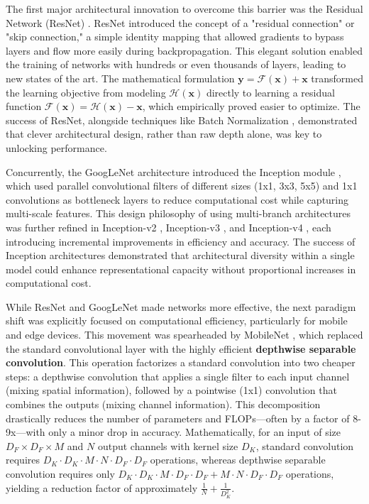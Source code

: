 \documentclass[12pt, a4paper]{article}
\begin{document}
The first major architectural innovation to overcome this barrier was the Residual Network (ResNet) \cite{he2016deep}. ResNet introduced the concept of a "residual connection" or "skip connection," a simple identity mapping that allowed gradients to bypass layers and flow more easily during backpropagation. This elegant solution enabled the training of networks with hundreds or even thousands of layers, leading to new states of the art. The mathematical formulation $\mathbf{y} = \mathcal{F}(\mathbf{x}) + \mathbf{x}$ transformed the learning objective from modeling $\mathcal{H}(\mathbf{x})$ directly to learning a residual function $\mathcal{F}(\mathbf{x}) = \mathcal{H}(\mathbf{x}) - \mathbf{x}$, which empirically proved easier to optimize. The success of ResNet, alongside techniques like Batch Normalization \cite{ioffe2015batch}, demonstrated that clever architectural design, rather than raw depth alone, was key to unlocking performance.

Concurrently, the GoogLeNet architecture introduced the Inception module \cite{szegedy2015going}, which used parallel convolutional filters of different sizes (1x1, 3x3, 5x5) and 1x1 convolutions as bottleneck layers to reduce computational cost while capturing multi-scale features. This design philosophy of using multi-branch architectures was further refined in Inception-v2 \cite{ioffe2015batch}, Inception-v3 \cite{szegedy2016rethinking}, and Inception-v4 \cite{szegedy2017inception}, each introducing incremental improvements in efficiency and accuracy. The success of Inception architectures demonstrated that architectural diversity within a single model could enhance representational capacity without proportional increases in computational cost.

While ResNet and GoogLeNet made networks more effective, the next paradigm shift was explicitly focused on computational efficiency, particularly for mobile and edge devices. This movement was spearheaded by MobileNet \cite{howard2017mobilenets}, which replaced the standard convolutional layer with the highly efficient \textbf{depthwise separable convolution}. This operation factorizes a standard convolution into two cheaper steps: a depthwise convolution that applies a single filter to each input channel (mixing spatial information), followed by a pointwise (1x1) convolution that combines the outputs (mixing channel information). This decomposition drastically reduces the number of parameters and FLOPs—often by a factor of 8-9x—with only a minor drop in accuracy. Mathematically, for an input of size $D_F \times D_F \times M$ and $N$ output channels with kernel size $D_K$, standard convolution requires $D_K \cdot D_K \cdot M \cdot N \cdot D_F \cdot D_F$ operations, whereas depthwise separable convolution requires only $D_K \cdot D_K \cdot M \cdot D_F \cdot D_F + M \cdot N \cdot D_F \cdot D_F$ operations, yielding a reduction factor of approximately $\frac{1}{N} + \frac{1}{D_K^2}$.
\end{document}
